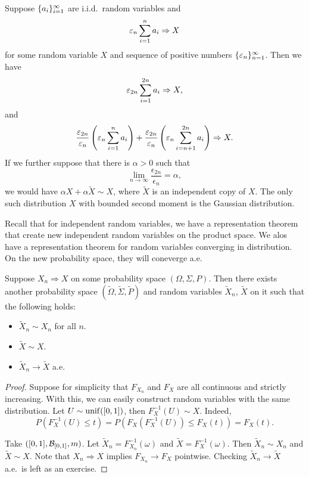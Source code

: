 \documentclass[a4paper]{article}
\newcommand{\convd}{\Rightarrow}
\begin{document}
\begin{eg}
  Suppose $\{ a_i \}_{i=1}^\infty$ are i.i.d.\ random variables and
  \[
    \epsilon_n \sumi^n a_i \convd X
  \]
  for some random variable $X$ and sequence of positive
  numbers $\{ \varepsilon_n \}_{n=1}^\infty$.
  Then we have
  \[
    \epsilon_{2n} \sumi^{2n} a_i \convd X,
  \]
  and
  \[
    \frac{\epsilon_{2n}}{\epsilon_n} \left( \epsilon_n \sumi^n a_i \right)
    + \frac{\epsilon_{2n}}{\epsilon_n} \left( \epsilon_n \sum_{i=n+1}^{2n} a_i \right)
    \convd X.
  \]
  If we further suppose that there is $\alpha > 0$ such that
  \[
    \lim_{n \to \infty} \frac{\epsilon_{2n}}{\epsilon_n} = \alpha,
  \]
  we would have $\alpha X + \alpha \tilde{X} \sim X$, where
  $\tilde{X}$ is an independent copy of $X$. The only such distribution
  $X$ with bounded second moment is the Gaussian distribution.

\end{eg}

Recall that for independent random variables, we have a representation
theorem that create new independent random variables on the product space.
We alos have a representation theorem for random variables converging
in distribution. On the new probability space, they will coneverge a.e.\

\begin{thm}
  Suppose $X_n \convd X$ on some probability space $(\Omega, \Sigma, P)$.
  Then there exists another probability space $(\tilde{\Omega},
    \tilde{\Sigma}, \tilde{P})$ and random variables $\tilde{X}_n$,
  $\tilde{X}$ on it such that the following holds:
  \begin{itemize}
    \item $\tilde{X}_n \sim X_n$ for all $n$.
    \item $\tilde{X} \sim X$.
    \item $\tilde{X}_n \to \tilde{X}$ a.e.\
  \end{itemize}
\end{thm}

\begin{proof}
  Suppose for simplicity that $F_{X_n}$ and $F_X$ are all continuous and
  strictly increasing. With this, we can easily construct random
  variables with the same distribution. Let $U \sim \operatorname{unif}([0, 1])$,
  then $F_X^{-1} (U) \sim X$. Indeed,
  \[
    P \left( F_X^{-1} (U) \leq t \right)
    = P \left( F_X (F_X^{-1} (U)) \leq F_X (t) \right)
    = F_X (t).
  \]

  Take $([0, 1], \mathcal{B}_{[0, 1]}, m)$.
  Let $\tilde{X}_n = F_{X_n}^{-1} (\omega)$
  and $\tilde{X} = F_X^{-1} (\omega)$. Then
  $\tilde{X}_n \sim X_n$ and $\tilde{X} \sim X$.
  Note that $X_n \convd X$
  implies $F_{X_n} \to F_X$ pointwise. Checking
  $\tilde{X}_n \to \tilde{X}$ a.e.\ is left as an exercise.

\end{proof}
\end{document}
